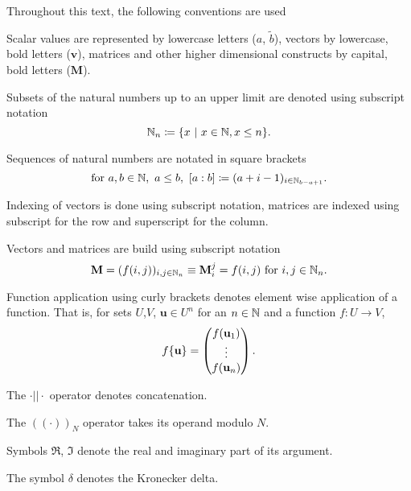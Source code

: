 Throughout this text, the following conventions are used
\begin{compactitem}
	\item Scalar values are represented by lowercase letters ($a$, $\tilde b$), vectors by lowercase, bold letters ($\mathbf v$), matrices and other higher dimensional constructs by capital, bold letters ($\mathbf M$).
	\item Subsets of the natural numbers up to an upper limit are denoted using subscript notation
		\[
			\N_n \coloneqq \{ x \ |\ x \in \N, x \le n\} \text.
		\]
	\item Sequences of natural numbers are notated in square brackets
		\[
			\text{for } a,b \in \mathbb{N},\ a \le b,\ [a:b] \coloneqq (a+i-1)_{i \in \mathbb{N}_{b-a+1}} \text.
		\]
	\item Indexing of vectors is done using subscript notation, matrices are indexed using subscript for the row and superscript for the column.
	\item Vectors and matrices are build using subscript notation
		\[
			\mathbf M = (f(i,j))_{i,j \in \mathbb{N}_n} \equiv \mathbf M_i^j = f(i,j) \text{ for } i,j \in \mathbb{N}_n \text.
		\]
	\item Function application using curly brackets denotes element wise application of a function.
		That is, for sets $U$,$V$, $\mathbf u \in U^n$ for an $n \in \mathbb{N}$ and a function $f: U \to V$,
		\[
			f\{\mathbf u\} = \begin{pmatrix}
				f(\mathbf u_1) \\ \vdots \\ f(\mathbf u_n)
			\end{pmatrix} \text.
		\]
	\item The $\cdot||\cdot$ operator denotes concatenation.
	\item The $((\cdot))_N$ operator takes its operand modulo $N$.
	\item Symbols $\Re$, $\Im$ denote the real and imaginary part of its argument.
	\item The symbol $\delta$ denotes the Kronecker delta.
\end{compactitem}
